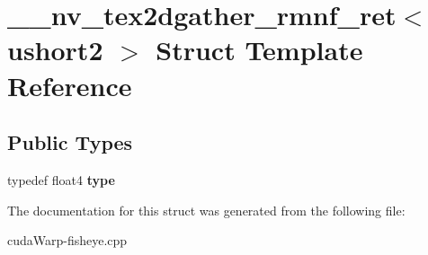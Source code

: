\hypertarget{struct____nv__tex2dgather__rmnf__ret_3_01ushort2_01_4}{}\section{\+\_\+\+\_\+nv\+\_\+tex2dgather\+\_\+rmnf\+\_\+ret$<$ ushort2 $>$ Struct Template Reference}
\label{struct____nv__tex2dgather__rmnf__ret_3_01ushort2_01_4}
\subsection*{Public Types}
\begin{DoxyCompactItemize}
\item 
typedef float4 {\bfseries type}\hypertarget{struct____nv__tex2dgather__rmnf__ret_3_01ushort2_01_4_a4890e8a4428357c0f13d9f91ce1804ad}{}\label{struct____nv__tex2dgather__rmnf__ret_3_01ushort2_01_4_a4890e8a4428357c0f13d9f91ce1804ad}

\end{DoxyCompactItemize}


The documentation for this struct was generated from the following file\+:\begin{DoxyCompactItemize}
\item 
cuda\+Warp-\/fisheye.\+cpp\end{DoxyCompactItemize}

